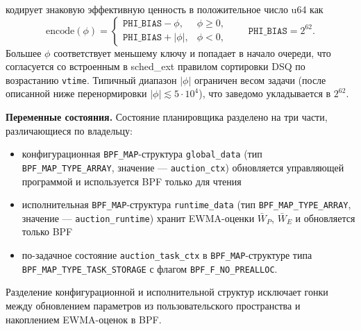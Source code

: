 \documentclass[14pt, oneside]{extbook}
\begin{document}
        кодирует знаковую эффективную ценность в положительное
        число u64 как
        \[
                \mathrm{encode}(\phi) = \begin{cases}
                        \texttt{PHI\_BIAS} - \phi, & \phi \geq 0, \\
                        \texttt{PHI\_BIAS} + |\phi|, & \phi < 0,
                \end{cases}
                \qquad
                \texttt{PHI\_BIAS} = 2^{62}.
        \]
        Большее $\phi$ соответствует меньшему ключу и попадает
        в начало очереди, что согласуется со встроенным в
        sched\_ext правилом сортировки DSQ по возрастанию
        \texttt{vtime}. Типичный диапазон $|\phi|$ ограничен
        весом задачи (после описанной ниже перенормировки
        $|\phi| \lesssim 5 \cdot 10^4$), что заведомо
        укладывается в $2^{62}$.

        \textbf{Переменные состояния.}
        Состояние планировщика разделено на три части,
        различающиеся по владельцу:
        \begin{sloppypar}
        \begin{itemize}
                \item конфигурационная
                        \texttt{BPF\_\allowbreak MAP}-структура
                        \texttt{global\_\allowbreak data} (тип
                        \texttt{BPF\_\allowbreak MAP\_\allowbreak TYPE\_\allowbreak ARRAY},
                        значение --- \texttt{auction\_\allowbreak ctx})
                        обновляется управляющей программой и
                        используется BPF только для чтения
                \item исполнительная
                        \texttt{BPF\_\allowbreak MAP}-структура
                        \texttt{runtime\_\allowbreak data} (тип
                        \texttt{BPF\_\allowbreak MAP\_\allowbreak TYPE\_\allowbreak ARRAY},
                        значение --- \texttt{auction\_\allowbreak runtime})
                        хранит EWMA-оценки $\bar W_P$, $\bar W_E$
                        и обновляется только BPF
                \item по-задачное состояние
                        \texttt{auction\_\allowbreak task\_\allowbreak ctx} в
                        \texttt{BPF\_\allowbreak MAP}-структуре типа
                        \texttt{BPF\_\allowbreak MAP\_\allowbreak TYPE\_\allowbreak TASK\_\allowbreak STORAGE}
                        с флагом
                        \texttt{BPF\_F\_\allowbreak NO\_\allowbreak PREALLOC}.
        \end{itemize}
        \end{sloppypar}
        Разделение конфигурационной и исполнительной структур
        исключает гонки между обновлением параметров из
        пользовательского пространства и накоплением
        EWMA-оценок в BPF.
\end{document}

